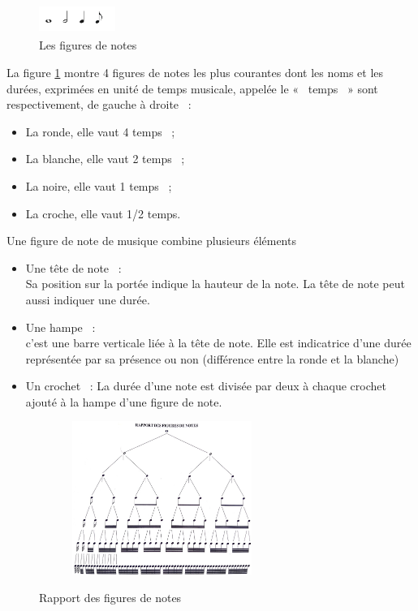 \begin{figure}[h]
	\centering
	\includegraphics[height=10mm, width=25mm]{
    z_images/3_methodes/0_notation_de_la_batterie/0_figures_de_notes.png}
    \caption{Les figures de notes}
    \label{4_notes}
\end{figure}
La figure \ref{4_notes} montre 4 figures de notes les plus courantes dont les
noms et les durées, exprimées en unité de temps musicale, appelée le «~ temps~ »
sont respectivement, de gauche à droite~ :
\begin{itemize}
    \item La ronde, elle vaut 4 temps~ ;
    \item La blanche, elle vaut 2 temps~ ;
    \item La noire, elle vaut 1 temps~ ;
    \item La croche, elle vaut 1/2 temps.
\end{itemize}
Une figure de note \cite{danhauser} de musique combine plusieurs éléments
\cite{gould2016behind}
\begin{itemize}
	\item Une tête de note~ :\\
	Sa position sur la portée indique la hauteur de la note. La tête de note
    peut aussi indiquer une durée.
	\item Une hampe~ :\\
	c’est une barre verticale liée à la tête de note. Elle est indicatrice
    d’une durée représentée par sa présence ou non (différence entre la ronde
    et la blanche)
	\item Un crochet~ : La durée d’une note est divisée par deux à chaque
     crochet ajouté à la hampe d’une figure de note.\\
\end{itemize}
\begin{figure}[h]
	\centering
	\includegraphics[height=50mm, width=80mm]{
    z_images/3_methodes/0_notation_de_la_batterie/1_rapport_figures_notes.png}
	\caption{Rapport des figures de notes}\cite{danhauser}
	\label{rapp_fig_notes}
\end{figure}

